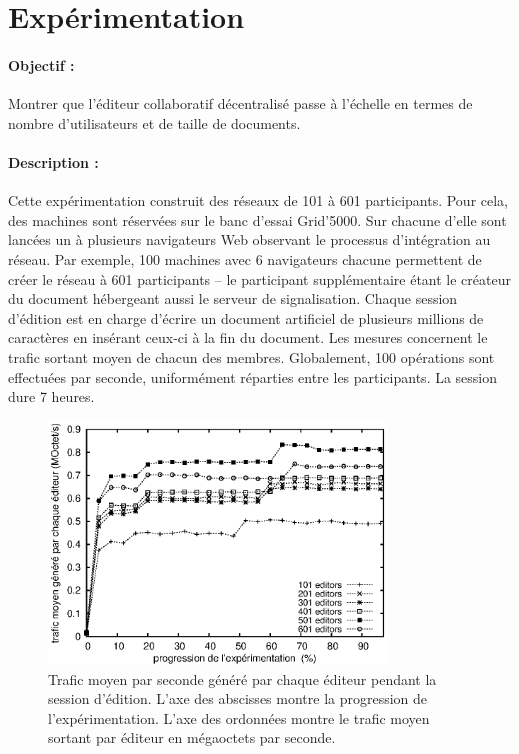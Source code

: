 
\section{Expérimentation}
\label{editor:sec:experimentation}

\paragraph{Objectif :} Montrer que l'éditeur collaboratif décentralisé \CRATE
passe à l'échelle en termes de nombre d'utilisateurs et de taille de
documents.

\paragraph{Description :} Cette expérimentation construit des réseaux de 101 à
601 participants. Pour cela, des machines sont réservées sur le banc d'essai
Grid'5000. Sur chacune d'elle sont lancées un à plusieurs navigateurs Web
observant le processus d'intégration au réseau. Par exemple, 100 machines avec 6
navigateurs chacune permettent de créer le réseau à 601 participants -- le
participant supplémentaire étant le créateur du document hébergeant aussi le
serveur de signalisation.  Chaque session d'édition est en charge d'écrire un
document artificiel de plusieurs millions de caractères en insérant ceux-ci à la
fin du document. Les mesures concernent le trafic sortant moyen de chacun des
membres. Globalement, 100 opérations sont effectuées par seconde, uniformément
réparties entre les participants. La session dure 7 heures.

\begin{figure}
  \begin{center}
    \includegraphics[width=0.8\textwidth]{img/editor/communication.eps}
    \caption[Trafic généré par \CRATE lors de sessions d'édition]
    {\label{editor:img:communication} Trafic moyen par seconde généré par chaque
      éditeur pendant la session d'édition. L'axe des abscisses montre la
      progression de l'expérimentation. L'axe des ordonnées montre le trafic
      moyen sortant par éditeur en mégaoctets par seconde.}
  \end{center}
\end{figure}

